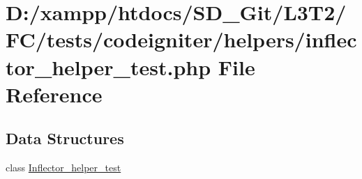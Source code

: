 \hypertarget{tests_2codeigniter_2helpers_2inflector__helper__test_8php}{}\section{D\+:/xampp/htdocs/\+S\+D\+\_\+\+Git/\+L3\+T2/\+F\+C/tests/codeigniter/helpers/inflector\+\_\+helper\+\_\+test.php File Reference}
\label{tests_2codeigniter_2helpers_2inflector__helper__test_8php}
\subsection*{Data Structures}
\begin{DoxyCompactItemize}
\item 
class \hyperlink{class_inflector__helper__test}{Inflector\+\_\+helper\+\_\+test}
\end{DoxyCompactItemize}
